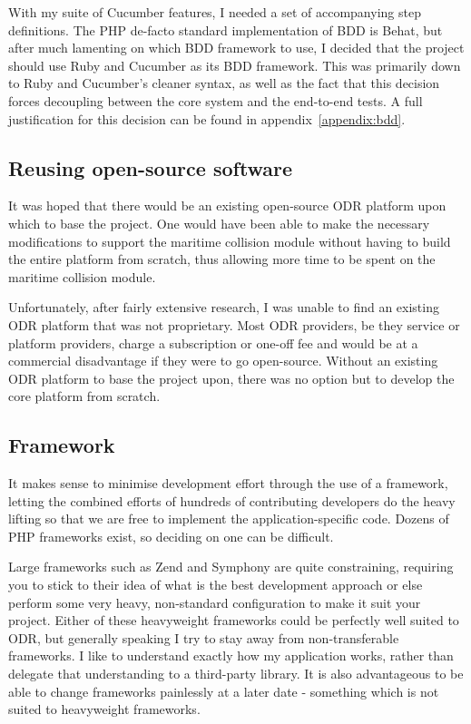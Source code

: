 With my suite of Cucumber features, I needed a set of accompanying step definitions. The PHP de-facto standard implementation of BDD is Behat,  but after much lamenting on which BDD framework to use, I decided that the project should use Ruby and Cucumber as its BDD framework. This was primarily down to Ruby and Cucumber's cleaner syntax, as well as the fact that this decision forces decoupling between the core system and the end-to-end tests. A full justification for this decision can be found in appendix~\ref{appendix:bdd}. 

\subsection{Reusing open-source software}

It was hoped that there would be an existing open-source ODR platform upon which to base the project. One would have been able to make the necessary modifications to support the maritime collision module without having to build the entire platform from scratch, thus allowing more time to be spent on the maritime collision module.

Unfortunately, after fairly extensive research, I was unable to find an existing ODR platform that was not proprietary. Most ODR providers, be they service or platform providers, charge a subscription or one-off fee and would be at a commercial disadvantage if they were to go open-source. Without an existing ODR platform to base the project upon, there was no option but to develop the core platform from scratch.

\subsection{Framework}\label{subsection:framework}

It makes sense to minimise development effort through the use of a framework, letting the combined efforts of hundreds of contributing developers do the heavy lifting so that we are free to implement the application-specific code. Dozens of PHP frameworks exist, so deciding on one can be difficult.

Large frameworks such as Zend and Symphony are quite constraining, requiring you to stick to their idea of what is the best development approach or else perform some very heavy, non-standard configuration to make it suit your project. Either of these heavyweight frameworks could be perfectly well suited to ODR, but generally speaking I try to stay away from non-transferable frameworks. I like to understand exactly how my application works, rather than delegate that understanding to a third-party library. It is also advantageous to be able to change frameworks painlessly at a later date - something which is not suited to heavyweight frameworks.

